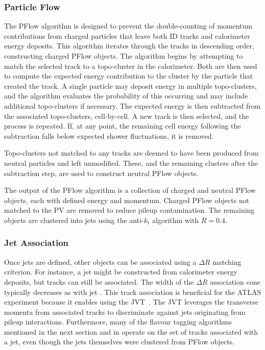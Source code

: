 \subsubsection{Particle Flow}

The \Gls{PFlow} algorithm is designed to prevent the double-counting of momentum contributions from charged particles that leave both \Gls{ID} tracks and calorimeter energy deposits.
This algorithm iterates through the tracks in descending \pt order, constructing charged \Gls{PFlow} objects.
The algorithm begins by attempting to match the selected track to a topo-cluster in the calorimeter.
Both are then used to compute the expected energy contribution to the cluster by the particle that created the track.
A single particle may deposit energy in multiple topo-clusters, and the algorithm evaluates the probability of this occurring and may include additional topo-clusters if necessary.
The expected energy is then subtracted from the associated topo-clusters, cell-by-cell.
A new track is then selected, and the process is repeated.
If, at any point, the remaining cell energy following the subtraction falls below expected shower fluctuations, it is removed.

Topo-clusters not matched to any tracks are deemed to have been produced from neutral particles and left unmodified.
These, and the remaining clusters after the subtraction step, are used to construct neutral \Gls{PFlow} objects.

The output of the \Gls{PFlow} algorithm is a collection of charged and neutral \Gls{PFlow} objects, each with defined energy and momentum.
Charged \Gls{PFlow} objects not matched to the \Gls{PV} are removed to reduce pileup contamination.
The remaining objects are clustered into jets using the anti-$k_t$ algorithm with $R=0.4$.

\subsubsection{Jet Association}

Once jets are defined, other objects can be associated using a $\Delta R$ matching criterion.
For instance, a jet might be constructed from calorimeter energy deposits, but tracks can still be associated.
The width of the $\Delta R$ association cone typically decreases as with jet \pt.
This track association is beneficial for the ATLAS experiment because it enables using the \Gls{JVT}~\cite{JVT}.
The \Gls{JVT} leverages the transverse momenta from associated tracks to discriminate against jets originating from pileup interactions.
Furthermore, many of the flavour tagging algorithms mentioned in the next section and in  operate on the set of tracks associated with a jet, even though the jets themselves were clustered from \Gls{PFlow} objects.

